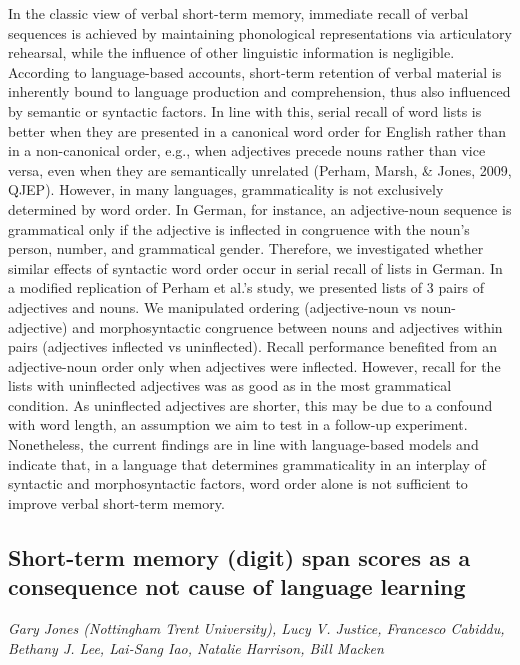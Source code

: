\documentclass[
  12pt,
]{book}
\begin{document}
In the classic view of verbal short-term memory, immediate recall of verbal sequences is achieved by maintaining phonological representations via articulatory rehearsal, while the influence of other linguistic information is negligible. According to language-based accounts, short-term retention of verbal material is inherently bound to language production and comprehension, thus also influenced by semantic or syntactic factors. In line with this, serial recall of word lists is better when they are presented in a canonical word order for English rather than in a non-canonical order, e.g., when adjectives precede nouns rather than vice versa, even when they are semantically unrelated (Perham, Marsh, \& Jones, 2009, QJEP). However, in many languages, grammaticality is not exclusively determined by word order. In German, for instance, an adjective-noun sequence is grammatical only if the adjective is inflected in congruence with the noun's person, number, and grammatical gender. Therefore, we investigated whether similar effects of syntactic word order occur in serial recall of lists in German. In a modified replication of Perham et al.'s study, we presented lists of 3 pairs of adjectives and nouns. We manipulated ordering (adjective-noun vs noun-adjective) and morphosyntactic congruence between nouns and adjectives within pairs (adjectives inflected vs uninflected). Recall performance benefited from an adjective-noun order only when adjectives were inflected. However, recall for the lists with uninflected adjectives was as good as in the most grammatical condition. As uninflected adjectives are shorter, this may be due to a confound with word length, an assumption we aim to test in a follow-up experiment. Nonetheless, the current findings are in line with language-based models and indicate that, in a language that determines grammaticality in an interplay of syntactic and morphosyntactic factors, word order alone is not sufficient to improve verbal short-term memory.

\hypertarget{short-term-memory-digit-span-scores-as-a-consequence-not-cause-of-language-learning}{%
\subsection{Short-term memory (digit) span scores as a consequence not cause of language learning}\label{short-term-memory-digit-span-scores-as-a-consequence-not-cause-of-language-learning}}

\emph{Gary Jones (Nottingham Trent University), Lucy V. Justice, Francesco Cabiddu, Bethany J. Lee, Lai-Sang Iao, Natalie Harrison, Bill Macken}
\end{document}
